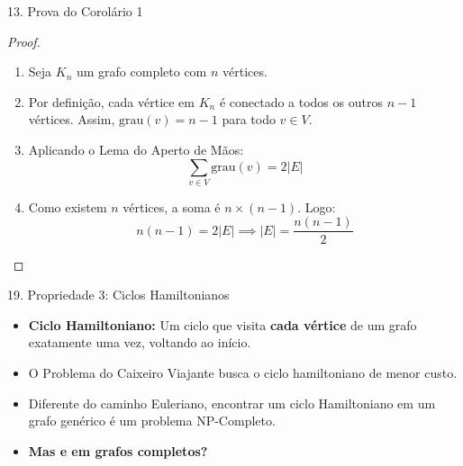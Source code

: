 \documentclass[9pt]{beamer}
\begin{document}
    \begin{frame}{13. Prova do Corolário 1}
        \begin{proof}
            \begin{enumerate}
                \item Seja $K_n$ um grafo completo com $n$ vértices.
                \item Por definição, cada vértice em $K_n$ é conectado a todos os outros $n-1$ vértices. Assim, $\text{grau}(v) = n-1$ para todo $v \in V$.
                \item Aplicando o Lema do Aperto de Mãos:
                \[ \sum_{v \in V} \text{grau}(v) = 2|E| \]
                \item Como existem $n$ vértices, a soma é $n \times (n-1)$. Logo:
                \[ n(n-1) = 2|E| \implies |E| = \frac{n(n-1)}{2} \]
            \end{enumerate}
        \end{proof}
    \end{frame}

    \begin{frame}{19. Propriedade 3: Ciclos Hamiltonianos}
        \begin{itemize}
            \item \textbf{Ciclo Hamiltoniano:} Um ciclo que visita \textbf{cada vértice} de um grafo exatamente uma vez, voltando ao início.
            \item O Problema do Caixeiro Viajante busca o ciclo hamiltoniano de menor custo.
            \item Diferente do caminho Euleriano, encontrar um ciclo Hamiltoniano em um grafo genérico é um problema NP-Completo.
            \item \textbf{Mas e em grafos completos?}
        \end{itemize}
    \end{frame}
\end{document}
